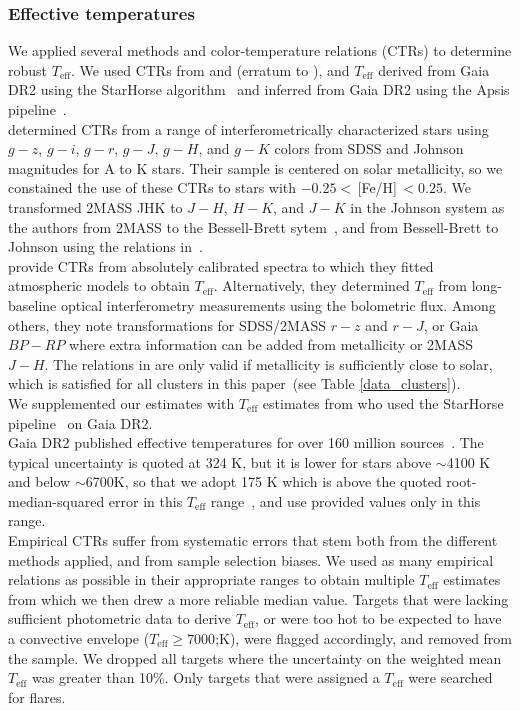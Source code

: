 \documentclass{aa}
\begin{document}
\subsubsection{Effective temperatures}
We applied several methods and color-temperature relations (CTRs) to determine robust $T_\mathrm{eff}$. We used CTRs from \citet{boyajian_stellar_2013} and \citet{mann_erratum_2016} (erratum to \citealt{mann_how_2015}), and $T_\mathrm{eff}$ derived from Gaia DR2 using the StarHorse algorithm~\citep{queiroz_starhorse_2018} and inferred from Gaia DR2 using the Apsis pipeline~\citep{bailerjones_apsis_2013, andrae_gaiaapsis_2018}.
\\
\citet{boyajian_stellar_2013} determined CTRs from a range of interferometrically characterized stars using $g-z$, $g-i$, $g-r$, $g-J$, $g-H$, and $g-K$ colors from SDSS and Johnson magnitudes for A to K stars. Their sample is centered on solar metallicity, so we constained the use of these CTRs to stars with $-0.25<$\,[Fe/H]$\,<0.25$. We transformed 2MASS JHK to $J-H$, $H-K$, and $J-K$ in the Johnson system  as the authors from 2MASS to the Bessell-Brett sytem~\citep{carpenter_color_2001}, and from Bessell-Brett to Johnson using the relations in~\citet{bessell_brett_1988}. 
\\
\citet{mann_how_2015} provide CTRs from absolutely calibrated spectra to which they fitted atmospheric models to obtain $T_\mathrm{eff}$. Alternatively, they determined $T_\mathrm{eff}$ from long-baseline optical interferometry measurements using the bolometric flux. Among others, they note transformations for SDSS/2MASS $r-z$ and $r-J$, or Gaia $BP-RP$ where extra information can be added from metallicity or 2MASS $J-H$. The relations in \citet{mann_how_2015} are only valid if metallicity is sufficiently close to solar, which is satisfied for all clusters in this paper~(see Table \ref{data_clusters}). 
\\
We supplemented our estimates with $T_\mathrm{eff}$ estimates from \citet{anders_starhorse_2019} who used the StarHorse pipeline~\citep{queiroz_starhorse_2018} on Gaia DR2.
\\
Gaia DR2 published effective temperatures for over 160 million sources~\citep{gaia_dr2_release_2018}. The typical uncertainty is quoted at 324 K, but it is lower for stars above $\sim$4100 K and below $\sim$6700K, so that we adopt 175 K which is above the quoted root-median-squared error in this $T_\mathrm{eff}$ range~\citep{andrae_gaiaapsis_2018}, and use provided values only in this range.
\\
Empirical CTRs suffer from systematic errors that stem both from the different methods applied, and from sample selection biases. We used as many empirical relations as possible in their appropriate ranges to obtain multiple $T_\mathrm{eff}$ estimates from which we then drew a more reliable median value. Targets that were lacking sufficient photometric data to derive $T_\mathrm{eff}$, or were too hot to be expected to have a convective envelope ($T_\mathrm{eff} \geq 7000$;K), were flagged accordingly, and removed from the sample. We dropped all targets where the uncertainty on the weighted mean $T_\mathrm{eff}$ was greater than 10\%. Only targets that were assigned a $T_\mathrm{eff}$ were searched for flares. 
\end{document}
